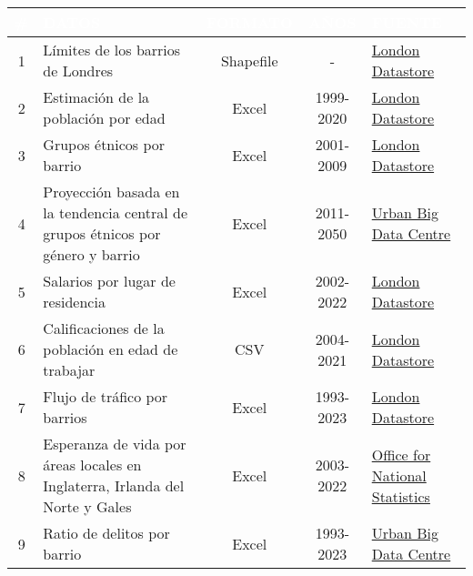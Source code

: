 \documentclass[12pt,a4paper,twoside]{book}
\begin{document}
\begin{table}[H]
    \centering
    \begin{tabular}{cm{15em}ccm{10em}}
       \hline
       \rowcolor[HTML]{004AAD}
       \textcolor{white}{\textbf{\#}} & \textcolor{white}{\textbf{DATOS}} & \textcolor{white}{\textbf{FORMATO}} & \textcolor{white}{\textbf{AÑOS}} & \textcolor{white}{\textbf{FUENTE}} \\
       \hline
         1 & Límites de los barrios de Londres & Shapefile & - &\href{https://data.london.gov.uk/dataset/statistical-gis-boundary-files-london}
         {London Datastore} \\
       \hline
         2 & Estimación de la población por edad & Excel & 1999-2020 & \href{https://data.london.gov.uk/dataset/ons-mid-year-population-estimates-custom-age-tables}{London Datastore} \\
       \hline
         3 & Grupos étnicos por barrio & Excel & 2001-2009 & \href{https://data.london.gov.uk/dataset/ethnic-groups-borough}{London Datastore} \\
       \hline
         4 & Proyección basada en la tendencia central de grupos étnicos por género y barrio & Excel & 2011-2050 & \href{https://data.ubdc.ac.uk/datasets/ethnic-groups-gender-borough/resource/5b9dffc9-0904-4474-b71b-68768fa68d1b}{Urban Big Data Centre} \\
       \hline
         5 & Salarios por lugar de residencia & Excel & 2002-2022 & \href{https://data.london.gov.uk/dataset/earnings-place-residence-borough}{London Datastore} \\
       \hline
         6 & Calificaciones de la población en edad de trabajar & CSV & 2004-2021 & \href{https://data.london.gov.uk/dataset/qualifications-working-age-population-nvq-borough}{London Datastore} \\
       \hline
         7 & Flujo de tráfico por barrios & Excel & 1993-2023 & \href{https://data.london.gov.uk/dataset/traffic-flows-borough}{London Datastore} \\
       \hline
         8 & Esperanza de vida por áreas locales en Inglaterra, Irlanda del Norte y Gales & Excel & 2003-2022 & \href{https://www.ons.gov.uk/peoplepopulationandcommunity/healthandsocialcare/healthandlifeexpectancies/datasets/lifeexpectancyforlocalareasinenglandnorthernirelandandwalesbetween2001to2003and2020to2022}{Office for National Statistics} \\
       \hline
         9 & Ratio de delitos por barrio & Excel & 1993-2023 & \href{https://data.ubdc.ac.uk/datasets/crime-rates-borough}{Urban Big Data Centre} \\

\end{tabular}
\end{table}
\end{document}
